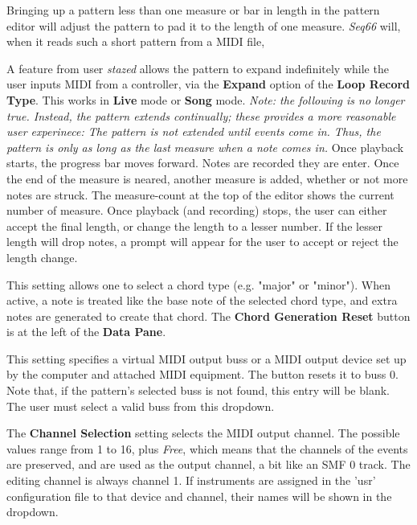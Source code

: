    Bringing up a pattern less than one measure or bar in
   length in the pattern editor will adjust the pattern to pad it to the
   length of one measure.
   \textsl{Seq66} will, when it reads such a short pattern
   from a MIDI file,

   A feature from user \textsl{stazed} allows the pattern to expand
   indefinitely while the user inputs MIDI from a controller, via the
   \textbf{Expand} option of the \textbf{Loop Record Type}.
   This works in \textbf{Live} mode or \textbf{Song} mode.
   \textsl{Note: the following is no longer true.
   Instead, the pattern extends continually; these provides a more
   reasonable user experinece:
   The pattern is not extended until events come in.
   Thus, the pattern is only as long as the last measure when a note comes in.}
   Once playback starts, the progress bar moves forward.
   Notes are recorded they are enter.
   Once the end of the measure is neared, another
   measure is added, whether or not more notes are struck.
   The measure-count at the top of the editor shows the current number
   of measure.
   Once playback (and recording) stops, the user can either accept the
   final length, or change the length to a lesser number.
   If the lesser length will drop notes, a prompt will appear
   for the user to accept or reject the length change.

   This setting allows one to select a chord type (e.g. "major" or "minor").
   When active, a note is treated like the base note of the selected chord
   type, and extra notes are generated to create that chord.
   The \textbf{Chord Generation Reset} button is at the left of the
   \textbf{Data Pane}.

   This setting specifies a virtual MIDI output buss or a
   MIDI output device set up by the computer and
   attached MIDI equipment.
   The button resets it to buss 0.
   Note that, if the pattern's selected buss is not found, this entry will be
   blank.  The user must select a valid buss from this dropdown.

   The \textbf{Channel Selection} setting selects the MIDI output channel.
   The possible values range from 1 to 16, plus \textsl{Free}, which means
   that the channels of the events are preserved, and are used as the output
   channel, a bit like an SMF 0 track.
   The editing channel is always channel 1.
   If instruments are assigned in the 'usr' configuration file
   to that device and channel, their names will be shown in the dropdown.

